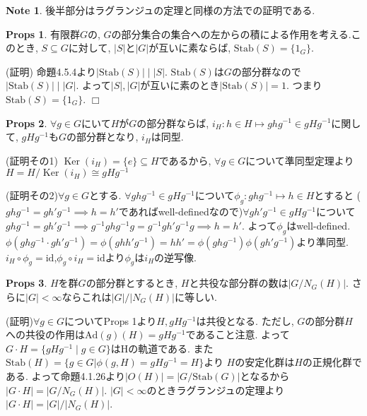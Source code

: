 \documentclass[dvipdfmx]{jsarticle}
\theoremstyle{definition}
\newtheorem{props}{Props}
\newtheorem{note}{Note}
\numberwithin{equation}{section}
\numberwithin{props}{section}
\numberwithin{definition}{section}
\numberwithin{note}{section}
\DeclareMathOperator{\Ker}{Ker}
\newcommand{\id}{\mathrm{id}}
\newcommand{\Stab}{\mathrm{Stab}}
\newcommand{\Ad}{\mathrm{Ad}}
\begin{document}
\begin{note}
     後半部分はラグランジュの定理と同様の方法での証明である.
\end{note}

\begin{props}
     有限群$G$の, $G$の部分集合の集合への左からの積による作用を考える.このとき, $S\subseteq G$に対して, $\lvert S\rvert$と$\lvert G\rvert$が互いに素ならば, $\Stab(S)=\lbrace 1_G\rbrace$.
\end{props}
(証明) 命題4.5.4より$\lvert \Stab(S)\rvert \mid \lvert S\rvert$. $\Stab(S)$は$G$の部分群なので
$\lvert \Stab(S)\rvert \mid \lvert G\rvert$. よって$\lvert S\rvert,\lvert G\rvert$が互いに素のとき$\lvert \Stab(S)\rvert = 1$. つまり$\Stab(S)=\lbrace 1_G\rbrace$. $\Box$

\begin{props}
     $\forall g \in G$にいて$H$が$G$の部分群ならば, $i_H\colon h\in H \mapsto ghg^{-1}\in gHg^{-1}$に関して, $gHg^{-1}$も$G$の部分群となり, $i_H$は同型.
\end{props}
(証明その1) $\Ker(i_H)=\lbrace e\rbrace\subseteq H$であるから, $\forall g \in G$について準同型定理より$H=H/\Ker(i_H)\cong gHg^{-1}$

(証明その2)$\forall g \in G$とする. $\forall ghg^{-1}\in gHg^{-1}$について$\phi_g\colon ghg^{-1}\mapsto h\in H$とすると
($ghg^{-1} = gh'g^{-1}\implies h = h'$であればwell-definedなので)$\forall gh'g^{-1} \in gHg^{-1}$について
$ghg^{-1}=gh'g^{-1} \implies g^{-1} ghg^{-1} g=g^{-1}gh'g^{-1}g \implies h=h'$.
よって$\phi_g$はwell-defined.
$\phi(ghg^{-1}\cdot gh'g^{-1})=\phi(ghh'g^{-1})=hh'=\phi(ghg^{-1})\phi(gh'g^{-1})$より準同型.
$i_H\circ \phi_g=\id$,$\phi_g\circ i_H =\id$より$\phi_g$は$i_H$の逆写像.

\begin{props}
     $H$を群$G$の部分群とするとき, $H$と共役な部分群の数は$\lvert G/N_G(H)\rvert$. さらに$\lvert G\rvert<\infty$ならこれは$\lvert G\rvert/\lvert N_G(H)\rvert$に等しい.
\end{props}
(証明)$\forall g \in G$についてProps 1より$H, gHg^{-1}$は共役となる. ただし, $G$の部分群$H$への共役の作用は$\Ad(g)(H)=gHg^{-1}$であること注意. よって$G\cdot H=\lbrace gHg^{-1}\mid g\in G\rbrace$はHの軌道である. また$\Stab(H)=\lbrace g\in G|\phi(g, H)=gHg^{-1}=H\rbrace$より $H$の安定化群は$H$の正規化群である.
よって命題4.1.26より$\lvert O(H)\rvert =\lvert G/\Stab(G)\rvert$となるから$\lvert G\cdot H\rvert=\lvert G/N_G(H)\rvert$. $\lvert G\rvert <\infty$のときラグランジュの定理より$\lvert G\cdot H\rvert=\lvert G\rvert/\lvert N_G(H)\rvert$.
\end{document}
